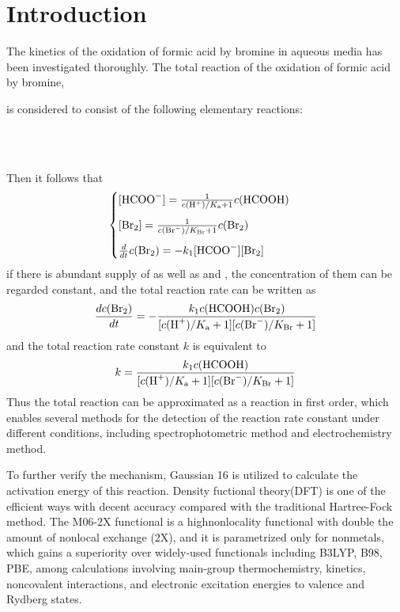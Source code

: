 \documentclass[%
preprint,
 amsmath,amssymb,
 aps,
10.5pt,
]{revtex4-1}
\begin{document}
\tableofcontents

\section{Introduction}
The kinetics of the oxidation of formic acid by bromine in aqueous media has been investigated thoroughly\cite{herbine1980oxidation,brusa1980kinetics}. The total reaction of the oxidation of formic acid by bromine,
\begin{center}
\end{center}
is considered to consist of the following elementary reactions:
\begin{center}
 \\
 \\
\end{center}
Then it follows that
\begin{equation}
	\begin{cases}
	[\ce{HCOO-}] = \frac{1}{c(\ce{H+})/K_\text{a}+1} c(\ce{HCOOH}) \\[0.3cm]
	[\ce{Br2}] = \frac{1}{c(\ce{Br-})/K_\text{\ce{Br}}+1} c(\ce{Br2})\\[0.3cm]
	\frac{d}{dt} c(\ce{Br2}) = - k_1 [\ce{HCOO-}] [\ce{Br2}] 
	\end{cases}
\end{equation}
if there is abundant supply of  as well as  and , the concentration of them can be regarded constant, and the total reaction rate can be written as
\begin{equation}
	\frac{d c(\ce{Br2})}{dt} = -\frac{k_1c(\ce{HCOOH})c(\ce{Br2})}{[c(\ce{H+})/K_\text{a}+1][c(\ce{Br-})/K_\text{\ce{Br}}+1]}
\end{equation}
and the total reaction rate constant $k$ is equivalent to
\begin{equation}
	k=\frac{k_1c(\ce{HCOOH})}{[c(\ce{H+})/K_\text{a}+1][c(\ce{Br-})/K_\text{\ce{Br}}+1]}
\end{equation}
Thus the total reaction can be approximated as a reaction in first order, which enables several methods for the detection of the reaction rate constant under different conditions, including spectrophotometric method and electrochemistry method.

To further verify the mechanism, Gaussian 16 is utilized to calculate the activation energy of this reaction. Density fuctional theory(DFT) is one of the efficient ways with decent accuracy compared with the traditional Hartree-Fock method. The M06-2X functional is a highnonlocality functional with double the amount of nonlocal exchange (2X), and it is parametrized only for nonmetals, which gains a superiority over widely-used functionals including B3LYP, B98, PBE, among calculations involving main-group thermochemistry, kinetics, noncovalent interactions, and electronic excitation energies to valence and Rydberg states.\cite{zhao2008m06}
\end{document}
